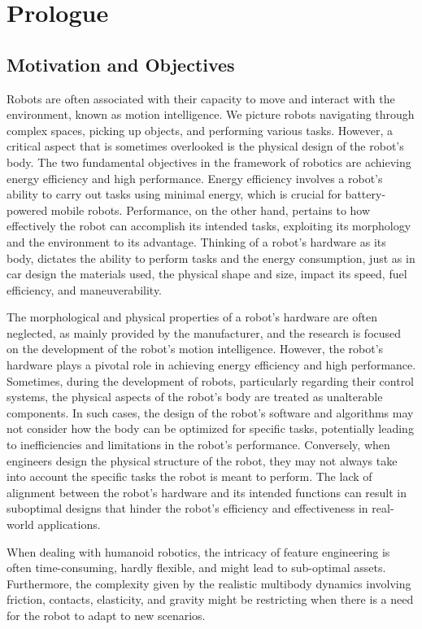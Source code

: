 \chapter*{Prologue}
\label{chp:00-Prologue}

\section*{Motivation and Objectives}

Robots are often associated with their capacity to move and interact with the environment, known as motion intelligence. We picture robots navigating through complex spaces, picking up objects, and performing various tasks. However, a critical aspect that is sometimes overlooked is the physical design of the robot's body. The two fundamental objectives in the framework of robotics are achieving energy efficiency and high performance. Energy efficiency involves a robot's ability to carry out tasks using minimal energy, which is crucial for battery-powered mobile robots. Performance, on the other hand, pertains to how effectively the robot can accomplish its intended tasks, exploiting its morphology and the environment to its advantage. Thinking of a robot's hardware as its body, dictates the ability to perform tasks and the energy consumption, just as in car design the materials used, the physical shape and size, impact its speed, fuel efficiency, and maneuverability.

The morphological and physical properties of a robot's hardware are often neglected, as mainly provided by the manufacturer, and the research is focused on the development of the robot's motion intelligence. However, the robot's hardware plays a pivotal role in achieving energy efficiency and high performance.
Sometimes, during the development of robots, particularly regarding their control systems, the physical aspects of the robot's body are treated as unalterable components. In such cases, the design of the robot's software and algorithms may not consider how the body can be optimized for specific tasks, potentially leading to inefficiencies and limitations in the robot's performance. Conversely, when engineers design the physical structure of the robot, they may not always take into account the specific tasks the robot is meant to perform. The lack of alignment between the robot's hardware and its intended functions can result in suboptimal designs that hinder the robot's efficiency and effectiveness in real-world applications.


When dealing with humanoid robotics, the intricacy of feature engineering is often time-consuming, hardly flexible, and might lead to sub-optimal assets. Furthermore, the complexity given by the realistic multibody dynamics involving friction, contacts, elasticity, and gravity might be restricting when there is a need for the robot to adapt to new scenarios.

